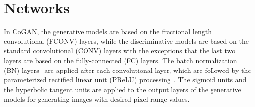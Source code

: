
\section{Networks}\label{subsec::nets}

In CoGAN, the generative models are based on the fractional length convolutional (FCONV) layers, while the discriminative models are based on the standard convolutional (CONV) layers with the exceptions that the last two layers are based on the fully-connected (FC) layers. The batch normalization (BN) layers~\cite{ioffe2015batch} are applied after each convolutional layer, which are followed by the parameterized rectified linear unit (PReLU) processing~\cite{he2015delving}. The sigmoid units and the hyperbolic tangent units are applied to the output layers of the generative models for generating images with desired pixel range values.


